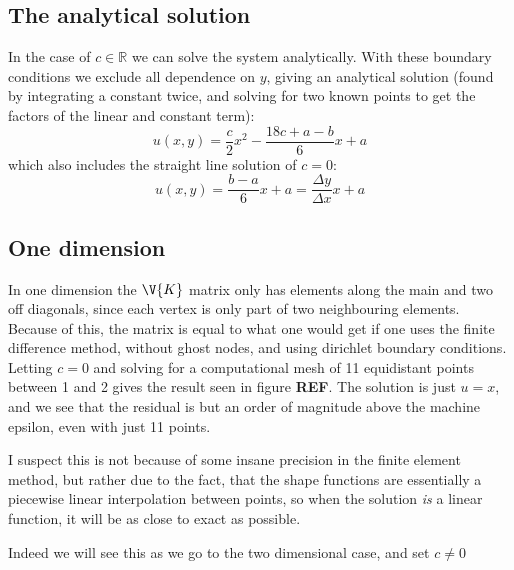 \documentclass[sigconf]{acmart}
\begin{document}
\subsection{The analytical solution}
In the case of $ c\in \mathbb{R} $ we can solve the system analytically. With these boundary conditions we exclude all dependence on $ y $, giving an analytical solution (found by integrating a constant twice, and solving for two known points to get the factors of the linear and constant term):
\begin{equation}\label{key}
	u(x, y) = \frac{c}{2}x^2 - \frac{18c + a - b}{6} x + a
\end{equation}
which also includes the straight line solution of $ c=0 $:
\begin{equation}\label{key}
	u(x,y) = \frac{b-a}{6} x + a = \frac{\Delta y}{\Delta x} x + a
\end{equation}

\subsection{One dimension}
In one dimension the $ \V{K} $ matrix only has elements along the main and two off diagonals, since each vertex is only part of two neighbouring elements. Because of this, the matrix is equal to what one would get if one uses the finite difference method, without ghost nodes, and using dirichlet boundary conditions. Letting $ c=0 $ and solving for a computational mesh of 11 equidistant points between 1 and 2 gives the result seen in figure \textbf{REF}. The solution is just $ u = x $, and we see that the residual is but an order of magnitude above the machine epsilon, even with just 11 points.

I suspect this is not because of some insane precision in the finite element method, but rather due to the fact, that the shape functions are essentially a piecewise linear interpolation between points, so when the solution \textit{is} a linear function, it will be as close to exact as possible.

Indeed we will see this as we go to the two dimensional case, and set $ c\neq 0 $
\end{document}
